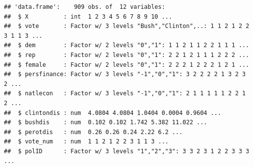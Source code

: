 \documentclass[
]{article}
\newenvironment{Shaded}{\begin{snugshade}}{\end{snugshade}}
\newcommand{\DecValTok}[1]{\textcolor[rgb]{0.00,0.00,0.81}{#1}}
\newcommand{\FunctionTok}[1]{\textcolor[rgb]{0.00,0.00,0.00}{#1}}
\newcommand{\NormalTok}[1]{#1}
\newcommand{\OtherTok}[1]{\textcolor[rgb]{0.56,0.35,0.01}{#1}}
\newcommand{\SpecialCharTok}[1]{\textcolor[rgb]{0.00,0.00,0.00}{#1}}
\begin{document}
\begin{Shaded}
\end{Shaded}

\begin{verbatim}
## 'data.frame':    909 obs. of  12 variables:
##  $ X          : int  1 2 3 4 5 6 7 8 9 10 ...
##  $ vote       : Factor w/ 3 levels "Bush","Clinton",..: 1 1 2 1 2 2 3 1 1 3 ...
##  $ dem        : Factor w/ 2 levels "0","1": 1 1 2 1 1 2 2 1 1 1 ...
##  $ rep        : Factor w/ 2 levels "0","1": 2 2 1 2 1 1 1 2 2 2 ...
##  $ female     : Factor w/ 2 levels "0","1": 2 2 2 1 2 2 2 1 2 1 ...
##  $ persfinance: Factor w/ 3 levels "-1","0","1": 3 2 2 2 2 1 3 2 3 2 ...
##  $ natlecon   : Factor w/ 3 levels "-1","0","1": 2 1 1 1 1 1 2 2 1 2 ...
##  $ clintondis : num  4.0804 4.0804 1.0404 0.0004 0.9604 ...
##  $ bushdis    : num  0.102 0.102 1.742 5.382 11.022 ...
##  $ perotdis   : num  0.26 0.26 0.24 2.22 6.2 ...
##  $ vote_num   : num  1 1 2 1 2 2 3 1 1 3 ...
##  $ polID      : Factor w/ 3 levels "1","2","3": 3 3 2 3 1 2 2 3 3 3 ...
\end{verbatim}
\end{document}
